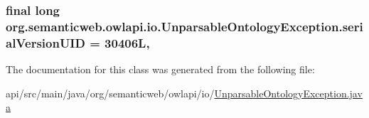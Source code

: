 \hypertarget{classorg_1_1semanticweb_1_1owlapi_1_1io_1_1_unparsable_ontology_exception_a02de9df2a0ea07e8318d9384ef342e0a}{
\subsubsection[{serial\-Version\-U\-I\-D}]{\setlength{\rightskip}{0pt plus 5cm}final long org.\-semanticweb.\-owlapi.\-io.\-Unparsable\-Ontology\-Exception.\-serial\-Version\-U\-I\-D = 30406\-L\hspace{0.3cm}{\ttfamily [static]}, {\ttfamily [private]}}}\label{classorg_1_1semanticweb_1_1owlapi_1_1io_1_1_unparsable_ontology_exception_a02de9df2a0ea07e8318d9384ef342e0a}


The documentation for this class was generated from the following file\-:\begin{DoxyCompactItemize}
\item 
api/src/main/java/org/semanticweb/owlapi/io/\hyperlink{_unparsable_ontology_exception_8java}{Unparsable\-Ontology\-Exception.\-java}\end{DoxyCompactItemize}
